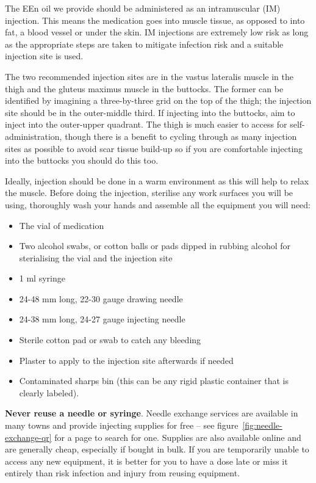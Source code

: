 \documentclass[twoside,a5paper]{article}
\begin{document}
The EEn oil we provide should be administered as an intramuscular (IM)
injection.  This means the medication goes into muscle tissue, as
opposed to into fat, a blood vessel or under the skin.  IM injections
are extremely low risk as long as the appropriate steps are taken to
mitigate infection risk and a suitable injection site is used.

The two recommended injection sites are in the vastus lateralis muscle
in the thigh and the gluteus maximus muscle in the buttocks.  The
former can be identified by imagining a three-by-three grid on the top
of the thigh; the injection site should be in the outer-middle third.
If injecting into the buttocks, aim to inject into the outer-upper
quadrant.  The thigh is much easier to access for self-administration,
though there is a benefit to cycling through as many injection sites
as possible to avoid scar tissue build-up so if you are comfortable
injecting into the buttocks you should do this too.

Ideally, injection should be done in a warm environment as this will
help to relax the muscle.  Before doing the injection, sterilise any
work surfaces you will be using, thoroughly wash your hands and
assemble all the equipment you will need:

\begin{itemize}
\item The vial of medication
\item Two alcohol swabs, or cotton balls or pads dipped in rubbing
  alcohol for sterialising the vial and the injection site
\item 1 ml syringe
\item 24-48 mm long, 22-30 gauge drawing needle
\item 24-38 mm long, 24-27 gauge injecting needle
\item Sterile cotton pad or swab to catch any bleeding
\item Plaster to apply to the injection site afterwards if needed
\item Contaminated sharps bin (this can be any rigid plastic container
  that is clearly labeled).
\end{itemize}

\textbf{Never reuse a needle or syringe}.  Needle exchange services
are available in many towns and provide injecting supplies for free --
see figure~\ref{fig:needle-exchange-qr} for a page to search for one.
Supplies are also available online and are generally cheap, especially
if bought in bulk.  If you are temporarily unable to access any new
equipment, it is better for you to have a dose late or miss it
entirely than risk infection and injury from reusing equipment.
\end{document}
